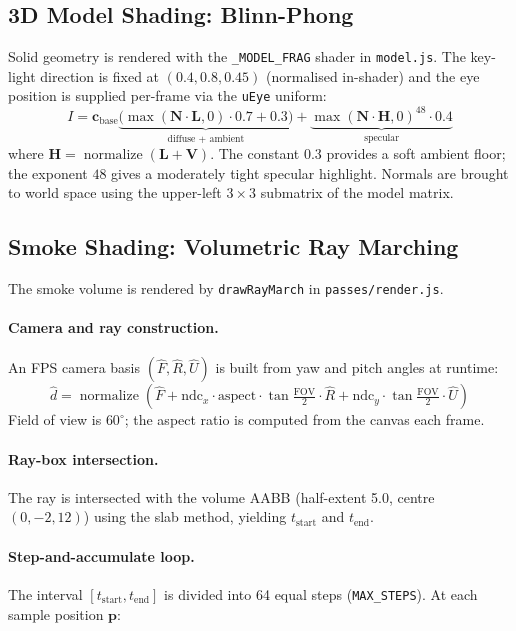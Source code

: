 \documentclass[a4paper, 12pt]{article}
\begin{document}
\subsection{3D Model Shading: Blinn-Phong}

Solid geometry is rendered with the \texttt{\_MODEL\_FRAG} shader in
\texttt{model.js}.
The key-light direction is fixed at $(0.4,0.8,0.45)$ (normalised in-shader)
and the eye position is supplied per-frame via the \texttt{uEye} uniform:
\[
  I = \mathbf{c}_{\text{base}}
      \underbrace{\bigl(\max(\mathbf{N}\cdot\mathbf{L},0)\cdot0.7+0.3\bigr)}_{\text{diffuse + ambient}}
    + \underbrace{\max(\mathbf{N}\cdot\mathbf{H},0)^{48}\cdot0.4}_{\text{specular}}
\]
where $\mathbf{H}=\operatorname{normalize}(\mathbf{L}+\mathbf{V})$.
The constant $0.3$ provides a soft ambient floor; the exponent $48$ gives a
moderately tight specular highlight.
Normals are brought to world space using the upper-left $3\times3$ submatrix
of the model matrix.

\subsection{Smoke Shading: Volumetric Ray Marching}

The smoke volume is rendered by \texttt{drawRayMarch} in \texttt{passes/render.js}.

\paragraph{Camera and ray construction.}
An FPS camera basis $(\hat{F},\hat{R},\hat{U})$ is built from yaw and pitch
angles at runtime:
\[
  \hat{d} = \operatorname{normalize}\!\left(
    \hat{F}
    + \mathrm{ndc}_x\cdot\mathrm{aspect}\cdot\tan\tfrac{\mathrm{FOV}}{2}\cdot\hat{R}
    + \mathrm{ndc}_y\cdot\tan\tfrac{\mathrm{FOV}}{2}\cdot\hat{U}
  \right)
\]
Field of view is $60^\circ$; the aspect ratio is computed from the canvas each
frame.

\paragraph{Ray-box intersection.}
The ray is intersected with the volume AABB (half-extent 5.0, centre
$(0,-2,12)$) using the slab method, yielding $t_{\text{start}}$ and
$t_{\text{end}}$.

\paragraph{Step-and-accumulate loop.}
The interval $[t_{\text{start}},t_{\text{end}}]$ is divided into 64 equal
steps (\texttt{MAX\_STEPS}).
At each sample position $\mathbf{p}$:
\end{document}
